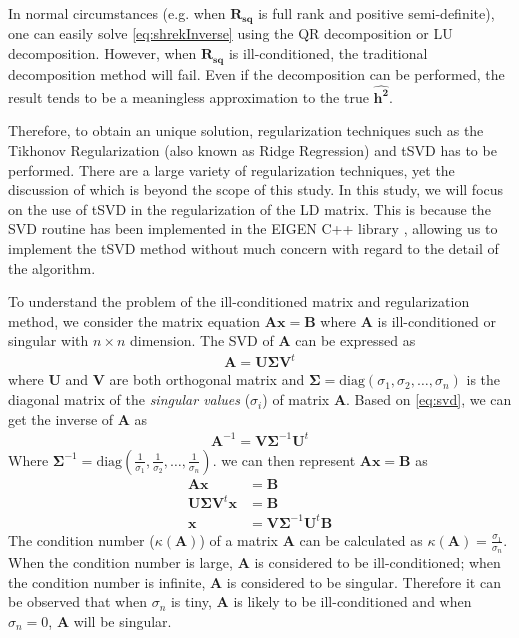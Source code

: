 \documentclass[12pt]{scrbook}
\begin{document}
In normal circumstances (e.g. when $\boldsymbol{R_{sq}}$ is full rank and positive semi-definite), one can easily solve \cref{eq:shrekInverse} using the QR decomposition or LU decomposition.
However, when $\boldsymbol{R_{sq}}$ is ill-conditioned, the traditional decomposition method will fail.
Even if the decomposition can be performed, the result tends to be a meaningless approximation to the true $\boldsymbol{\hat{h^2}}$. 

Therefore, to obtain an unique solution, regularization techniques such as the Tikhonov Regularization (also known as Ridge Regression) and \gls{tSVD} has to be performed\citep{Neumaier1998}. 
There are a large variety of regularization techniques, yet the discussion of which is beyond the scope of this study. 
In this study, we will focus on the use of \gls{tSVD} in the regularization of the \gls{LD} matrix.
This is because the \gls{SVD} routine has been implemented in the EIGEN C++ library \citep{eigenweb}, allowing us to implement the \gls{tSVD} method without much concern with regard to the detail of the algorithm. 

To understand the problem of the ill-conditioned matrix and regularization method, we consider the matrix equation $\boldsymbol{Ax}=\boldsymbol{B}$ where $\boldsymbol{A}$ is ill-conditioned or singular with $n\times n$ dimension.
The \gls{SVD} of $\boldsymbol{A}$ can be expressed as 
\begin{align}
\boldsymbol{A} = \boldsymbol{U\Sigma V}^t
\label{eq:svd}
\end{align}
where $\boldsymbol{U}$ and $\boldsymbol{V}$ are both orthogonal matrix and $\boldsymbol{\Sigma}=\mathrm{diag}(\sigma_1,\sigma_2,\dots,\sigma_n)$ is the diagonal matrix of the \emph{singular values} ($\sigma_i$) of matrix $\boldsymbol{A}$.
Based on \cref{eq:svd}, we can get the inverse of $\boldsymbol{A}$ as 
\begin{align}
\boldsymbol{A}^{-1}= \boldsymbol{V\Sigma}^{-1}\boldsymbol{U}^t
\label{eq:svdInverse}
\end{align}
Where $
\boldsymbol{\Sigma}^{-1} = \mathrm{diag}(\frac{1}{\sigma_1},\frac{1}{\sigma_2},\dots,\frac{1}{\sigma_n})$.
we can then represent $\boldsymbol{Ax}=\boldsymbol{B}$ as
\begin{align}
\boldsymbol{Ax}&=\boldsymbol{B} \nonumber\\
\boldsymbol{U\Sigma V}^t\boldsymbol{x}&=\boldsymbol{B} \nonumber\\
\boldsymbol{x}&=\boldsymbol{V\Sigma}^{-1}\boldsymbol{U}^t\boldsymbol{B}
\label{eq:solveBwithError}
\end{align}
The condition number ($\kappa(\boldsymbol{A})$) of a matrix $\boldsymbol{A}$ can be calculated as $\kappa(\boldsymbol{A})=\frac{\sigma_1}{\sigma_n}$.
When the condition number is large, $\boldsymbol{A}$ is considered to be ill-conditioned;
when the condition number is infinite, $\boldsymbol{A}$ is considered to be singular.
Therefore it can be observed that when $\sigma_n$ is tiny, $\boldsymbol{A}$ is likely to be ill-conditioned and when $\sigma_n=0$, $\boldsymbol{A}$ will be singular. 
\end{document}
